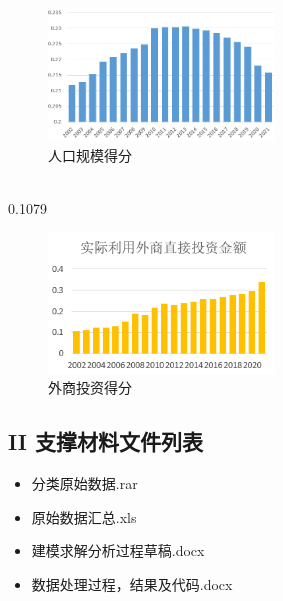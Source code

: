 \documentclass[UTF8]{article}
\begin{document}
	\begin{figure}[htb]
	\centering
	\includegraphics[width=6cm]{pictures/rkgmdf.png}
	\caption{人口规模得分}
	\label{zybfdf}
	\end{figure}
~\\0.1079

	\begin{figure}[htb]
	\centering
	\includegraphics[width=6cm]{pictures/wstzdf.png}
	\caption{外商投资得分}
	\label{wstzdf}
	\end{figure}
	\subsection*{II 支撑材料文件列表}
	\begin{itemize}
		\item 分类原始数据.rar
		\item 原始数据汇总.xls
		\item 建模求解分析过程草稿.docx
		\item 数据处理过程，结果及代码.docx
	\end{itemize}
\end{document}
